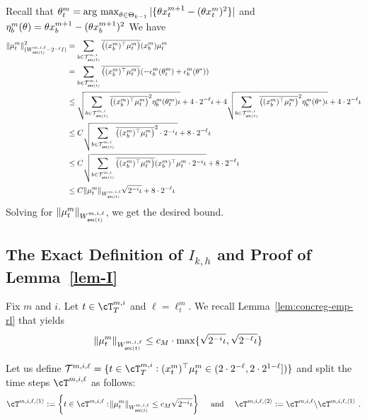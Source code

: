 Recall that ${\theta}_t^m=\operatorname*{arg~max}_{{\theta} \in {{\Theta}}_{k-1}} |\{{\theta} x_t^{m+1}-({\theta} x_t^{m})^2\}|$ and $\eta_b^m({\theta})={\theta} x_b^{m+1}-({\theta} x_b^{m+1})^2$
  We have
  \begin{align*}
  \|\mu_{t}^m \|_{(W_{\anc(t)}^{m,i,\ell} - 2^{-\ell} I )}^2 
  &= \sum_{b\in \mathcal{T}_{\anc(t)}^{m,i}} \clip{(x_{b}^m)^\top\mu_{t}^m} (x_{b}^m)\mu_{t}^m 
  \\&= \sum_{b\in \mathcal{T}_{\anc(t)}^{m,i}} \clip{(x_{b}^m)^\top\mu_{t}^m} (-\eps_{b}^m(\th_{t}^m) + \eps_{b}^m(\th^*)) 
  \\&\le  \sqrt{\sum_{b\in \mathcal{T}_{\anc(t)}^{m,i}} \clip{(x_{b}^m)^\top\mu_{t}^m}^2 \eta_{b}^m(\th_{t}^m) \iota}  + 4\cd 2^{-\ell} \iota + 4\sqrt{\sum_{b\in \mathcal{T}_{\anc(t)}^{m,i}} \clip{(x_{b}^m)^\top\mu_{t}^m}^2 \eta_{b}^m(\th^*) \iota} + 4\cd2^{-\ell} \iota 
  \\&\le C\sqrt{\sum_{b\in \mathcal{T}_{\anc(t)}^{m,i}} \clip{(x_{b}^m)^\top\mu_{t}^m}^2\cd 2^{-i} \iota}+8\cd 2^{-\ell}\iota %
  \\&\le C\sqrt{\sum_{b\in \mathcal{T}_{\anc(t)}^{m,i}} \clip{(x_{b}^m)^\top\mu_{t}^m} (x_{b}^m)^\T\mu_{t}^m \cd 2^{-i} \iota}+8\cd 2^{-\ell}\iota
  \\& \le C\|\mu_{t}^m\|_{W_{\anc(t)}^{m,i,\ell}}\sqrt{2^{-i}\iota}+8\cd 2^{-\ell}\iota
\end{align*}
Solving for $\|\mu_{t}^m\|_{W_{\operatorname{\mathsf{anc}}(t)}^{m,i,\ell}}$, we get the desired bound.

\subsection{The Exact Definition of $I_{k,h}$ and Proof of Lemma~\ref{lem-I}}\label{proof_of_lem_I}

Fix $m$ and $i$.
Let $t \in \cT^{m,i}_T$ and $\ell = \ell^m_t$.
We recall Lemma~\ref{lem:concreg-emp-rl} that yields
\begin{align*}
 \norm{\mu^m_{t}}_{W^{m,i,\ell}_{\operatorname{\mathsf{anc}}(t)}} 
  &\le c_M \cdot \max\{\sqrt{2^{-i} \iota}, \sqrt{2^{-\ell}\iota} \}
\end{align*}

Let us define $\blue{\mathcal{T}^{m,i,\ell}}=\{t \in \cT_T^{m,i}: (x_{t}^m)^\T \mu_{t}^m \in (2\cd2^{-\ell},2\cd 2^{1-\ell}])\}$
and split the time steps $\cT^{m,i,\ell}$  as follows:
\begin{align*}
  \blue{\cT^{m,i,\ell,\la1\ra}} := \cbr{t \in \cT^{m,i,\ell}: \norm{\mu^m_{t}}_{W^{m,i,\ell}_{\anc(t)}} \le c_M \sqrt{2^{-i} \iota} }  
  \text{~~~ and ~~~} 
  \blue{\cT^{m,i,\ell,\la2\ra}} := \cT^{m,i,\ell}  \sm \cT^{m,i,\ell,\la1\ra} ~.
\end{align*}

